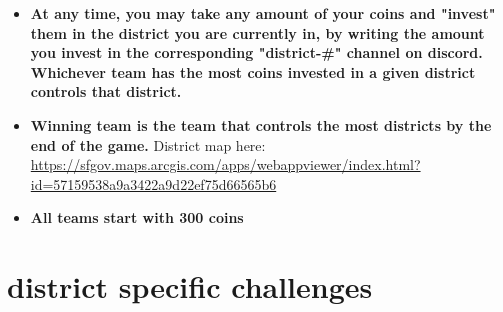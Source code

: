 \documentclass{article}
\begin{document}
\begin{itemize}
    \item \textbf{At any time, you may take any amount of your coins and "invest" them in the district you are currently in, by writing the amount you invest in the corresponding "district-\#" channel on discord. Whichever team has the most coins invested in a given district controls that district.}
    \item \textbf{Winning team is the team that controls the most districts by the end of the game.} District map here: \url{https://sfgov.maps.arcgis.com/apps/webappviewer/index.html?id=57159538a9a3422a9d22ef75d66565b6}
    \item \textbf{All teams start with 300 coins}
\end{itemize}

\section{district specific challenges}
\end{document}

